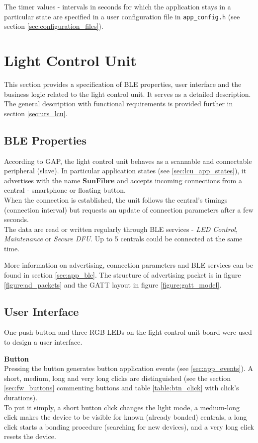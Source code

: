         The timer values - intervals in seconds for which the application stays in a particular state are specified in a user configuration file in \verb|app_config.h| (see section \ref{sec:configuration_files}).
            
        
        

\section{Light Control Unit}
    This section provides a specification of BLE properties, user interface and the business logic related to the light control unit. It serves as a detailed description. The general description with functional requirements is provided further in section \ref{sec:urs_lcu}. 
    
    \subsection{BLE Properties}
        \label{sec:lcu_ble_parameters}
        According to GAP, the light control unit behaves as a scannable and connectable peripheral (slave). In particular application states (see \ref{sec:lcu_app_states}), it advertises with the name \textbf{SunFibre} and accepts incoming connections from a central - smartphone or floating button.\\
        When the connection is established, the unit follows the central's timings (connection interval) but requests an update of connection parameters after a few seconds.\\
        The data are read or written regularly through BLE services - \textit{LED Control}, \textit{Maintenance} or \textit{Secure DFU}. Up to 5 centrals could be connected at the same time.
        
        More information on advertising, connection parameters and BLE services can be found in section \ref{sec:app_ble}. The structure of advertising packet is in figure \ref{figure:ad_packets} and the GATT layout in figure \ref{figure:gatt_model}.
        
        
    \subsection{User Interface} 
        One push-button and three RGB LEDs on the light control unit board were used to design a user interface.
        
        \textbf{Button}\\
            Pressing the button generates button application events (see \ref{sec:app_events}). A short, medium, long and very long clicks are distinguished (see the section \ref{sec:fw_buttons} commenting buttons and table \ref{table:btn_click} with click's durations).\\
            To put it simply, a short button click changes the light mode, a medium-long click makes the device to be visible for known (already bonded) centrals, a long click starts a bonding procedure (searching for new devices), and a very long click resets the device.
        
